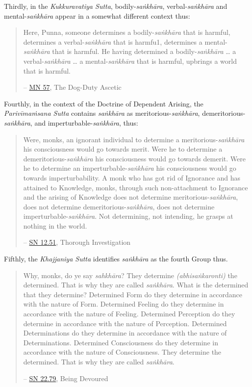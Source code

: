 Thirdly, in the \emph{Kukkuravatiya Sutta}, bodily-\emph{saṅkhāra}, verbal-\emph{saṅkhāra} and mental-\emph{saṅkhāra} appear in a somewhat different context thus:

\begin{quote}
Here, Punna, someone determines a bodily-\emph{saṅkhāra} that is harmful, determines a verbal-\emph{saṅkhāra} that is harmfu1, determines a mental-\emph{saṅkhāra} that is harmful. He having determined a bodily-\emph{saṅkhāra} \ldots{} a verbal-\emph{saṅkhāra} \ldots{} a mental-\emph{saṅkhāra} that is harmful, upbrings a world that is harmful.

 -- \href{https://suttacentral.net/mn57/en/bodhi}{MN 57}, The Dog-Duty Ascetic
\end{quote}

Fourthly, in the context of the Doctrine of Dependent Arising, the \emph{Parivīmaṁsana Sutta} contains \emph{saṅkhāra} as meritorious-\emph{saṅkhāra}, demeritorious-\emph{saṅkhāra}, and imperturbable-\emph{saṅkhāra}, thus:

\begin{quote}
Were, monks, an ignorant individual to determine a meritorious-\emph{saṅkhāra} his consciousness would go towards merit. Were he to determine a demeritorious-\emph{saṅkhāra} his consciousness would go towards demerit. Were he to determine an imperturbable-\emph{saṅkhāra} his consciousness would go towards imperturbability. A monk who has got rid of Ignorance and has attained to Knowledge, monks, through such non-attachment to Ignorance and the arising of Knowledge does not determine meritorious-\emph{saṅkhāra}, does not determine demeritorious-\emph{saṅkhāra}, does not determine imperturbable-\emph{saṅkhāra}. Not determining, not intending, he grasps at nothing in the world.

 -- \href{https://suttacentral.net/sn12.51/en/sujato}{SN 12.51}, Thorough Investigation
\end{quote}

Fifthly, the \emph{Khajjaniya Sutta} identifies \emph{saṅkhāra} as the fourth Group thus.

\begin{quote}
Why, monks, do ye say \emph{sahkhāra}? They determine \emph{(abhisaṅkaronti)} the determined. That is why they are called \emph{saṅkhāra}. What is the determined that they determine? Determined Form do they determine in accordance with the nature of Form. Determined Feeling do they determine in accordance with the nature of Feeling. Determined Perception do they determine in accordance with the nature of Perception. Determined Determinations do they determine in accordance with the nature of Determinations. Determined Consciousness do they determine in accordance with the nature of Consciousness. They determine the determined. That is why they are called \emph{saṅkhāra}.

 -- \href{https://suttacentral.net/sn22.79/en/bodhi}{SN 22.79}, Being Devoured
\end{quote}

